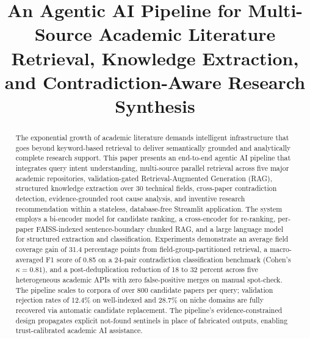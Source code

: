 \documentclass[conference]{IEEEtran}
\begin{document}
\title{An Agentic AI Pipeline for Multi-Source Academic Literature
Retrieval, Knowledge Extraction, and Contradiction-Aware Research Synthesis}

\author{
\and
{}
}

\maketitle

\begin{abstract}
The exponential growth of academic literature demands intelligent
infrastructure that goes beyond keyword-based retrieval to deliver
semantically grounded and analytically complete research support.
This paper presents an end-to-end agentic AI pipeline that integrates
query intent understanding, multi-source parallel retrieval across five
major academic repositories, validation-gated Retrieval-Augmented Generation
(RAG), structured knowledge extraction over 30 technical fields,
cross-paper contradiction detection, evidence-grounded root cause analysis,
and inventive research recommendation within a stateless, database-free
Streamlit application. The system employs a bi-encoder model for candidate
ranking, a cross-encoder for re-ranking, per-paper FAISS-indexed
sentence-boundary chunked RAG, and a large language model for structured
extraction and classification. Experiments demonstrate an average field
coverage gain of 31.4 percentage points from field-group-partitioned
retrieval, a macro-averaged F1 score of 0.85 on a 24-pair contradiction
classification benchmark (Cohen's $\kappa = 0.81$), and a
post-deduplication reduction of 18 to 32 percent across five heterogeneous
academic APIs with zero false-positive merges on manual spot-check.
The pipeline scales to corpora of over 800 candidate papers per query;
validation rejection rates of 12.4\% on well-indexed and 28.7\% on niche
domains are fully recovered via automatic candidate replacement.
The pipeline's evidence-constrained design propagates explicit not-found
sentinels in place of fabricated outputs, enabling trust-calibrated academic
AI assistance.
\end{abstract}
\end{document}
